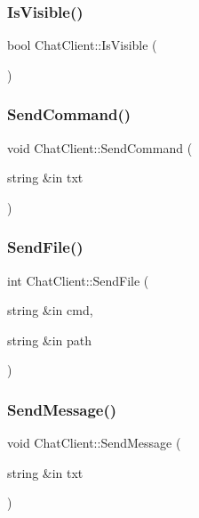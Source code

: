 \hypertarget{class_chat_client_a93eba5557dbdc524c5f2d4c0f3490d38}{}\label{class_chat_client_a93eba5557dbdc524c5f2d4c0f3490d38} 
\subsubsection{\texorpdfstring{Is\+Visible()}{IsVisible()}}
{\footnotesize\ttfamily bool Chat\+Client\+::\+Is\+Visible (\begin{DoxyParamCaption}{ }\end{DoxyParamCaption})}

\hypertarget{class_chat_client_a13f4f30bf03e04599227af3e85e67b81}{}\label{class_chat_client_a13f4f30bf03e04599227af3e85e67b81} 
\subsubsection{\texorpdfstring{Send\+Command()}{SendCommand()}}
{\footnotesize\ttfamily void Chat\+Client\+::\+Send\+Command (\begin{DoxyParamCaption}\item[{string \&in}]{txt }\end{DoxyParamCaption})}

\hypertarget{class_chat_client_ab73b9fce02fa5d55b7db085290e0e694}{}\label{class_chat_client_ab73b9fce02fa5d55b7db085290e0e694} 
\subsubsection{\texorpdfstring{Send\+File()}{SendFile()}}
{\footnotesize\ttfamily int Chat\+Client\+::\+Send\+File (\begin{DoxyParamCaption}\item[{string \&in}]{cmd,  }\item[{string \&in}]{path }\end{DoxyParamCaption})}

\hypertarget{class_chat_client_aeebdad7cf66c7243580af41df5d4ddf6}{}\label{class_chat_client_aeebdad7cf66c7243580af41df5d4ddf6} 
\subsubsection{\texorpdfstring{Send\+Message()}{SendMessage()}}
{\footnotesize\ttfamily void Chat\+Client\+::\+Send\+Message (\begin{DoxyParamCaption}\item[{string \&in}]{txt }\end{DoxyParamCaption})}

